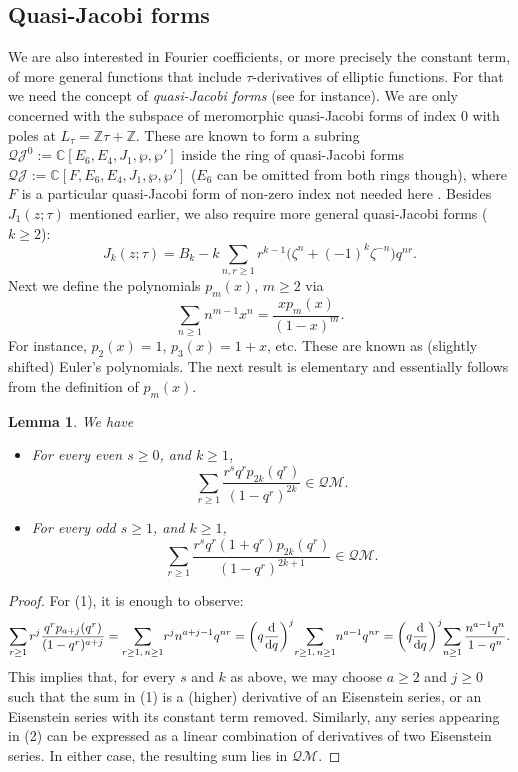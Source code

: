 \documentclass[10pt,a4paper]{amsart}
\numberwithin{equation}{section}
\newtheorem{Lemma}[Theorem]{Lemma}
\theoremstyle{definition}
\begin{document}
\subsection{Quasi-Jacobi forms}\label{section3.2}
We are also interested in Fourier coefficients, or more precisely the constant term, of more general functions that include $\tau$-derivatives of elliptic
functions. For that we need the concept of {\em quasi-Jacobi forms} (see \cite{Libgober,Ob, Ittersum} for instance).
We are only concerned with the subspace of meromorphic quasi-Jacobi forms of index $0$ with poles at $L_\tau=\mathbb{Z}\tau+\mathbb{Z}$. These are known to form a subring $\mathcal{QJ}^0:=\mathbb{C}[E_6,E_4,J_1,\wp,\wp']$ inside the ring of quasi-Jacobi forms $\mathcal{QJ}:=\mathbb{C}[F,E_6,E_4,J_1,\wp,\wp']$ ($E_6$ can be omitted from both rings though), where $F$ is a particular quasi-Jacobi form of non-zero index not needed here \cite{Ob}. Besides $J_1(z;\tau)$ mentioned earlier, we also require more general quasi-Jacobi forms ($k \geq 2$):
\[
J_k(z;\tau)=B_k - k \sum_{n, r \geq 1} r^{k-1}\bigl( \zeta^n + (-1)^k \zeta^{-n}\bigr) q^{nr}.
\]
Next we define the polynomials $p_m(x)$, $m \geq 2$ via
\[
\sum_{n \geq 1} n^{m-1} x^n=\frac{x p_{m}(x)}{(1-x)^{m}}.
\]
For instance, $p_2(x)=1$, $p_3(x)=1+x$, etc.
These are known as (slightly shifted) Euler's polynomials. The next result is elementary and essentially follows from the definition of $p_m(x)$.
\begin{Lemma} \label{euler} We have
\begin{itemize}\itemsep=0pt
\item[$(1)$] For every even $s \geq 0$, and $k \geq 1$,
\[
\sum_{r \geq 1} \frac{r^s q^r p_{2k}(q^r)}{(1-q^r)^{2k}} \in \mathcal{QM}.
\]
\item[$(2)$] For every odd $s \geq 1$, and $k \geq 1$,
\[
\sum_{r \geq 1} \frac{r^s q^r (1+q^r) p_{2k}(q^r)}{(1-q^r)^{2k+1}} \in \mathcal{QM}.
\]
\end{itemize}
\end{Lemma}
\begin{proof} For (1), it is enough to observe:
\begin{align*}
 \sum_{r \geq 1} r^j \frac{q^r p_{a+j}(q^r)}{(1-q^r)^{a+j}}= \sum_{r \geq 1,\, n \geq 1}\! r^j n^{a+j-1} q^{n r}= \left(q \frac{{\rm d}}{{\rm d}q} \right)^j \! \sum_{r \geq 1,\, n \geq 1}\! n^{a-1} q^{n r} =\left(q \frac{{\rm d}}{{\rm d}q}\right)^j\! \sum_{n \geq 1} \frac{n^{a-1} q^n}{1-q^n}.
\end{align*}
This implies that, for every $s$ and $k$ as above, we may choose $a \geq 2$ and $j \geq 0$ such that the sum in (1) is a (higher) derivative of an Eisenstein series, or an Eisenstein series with its constant term removed.
Similarly, any series appearing in (2) can be expressed as a linear combination of derivatives of two Eisenstein series.
In either case, the resulting sum lies in $\mathcal{QM}$.
\end{proof}
\end{document}

